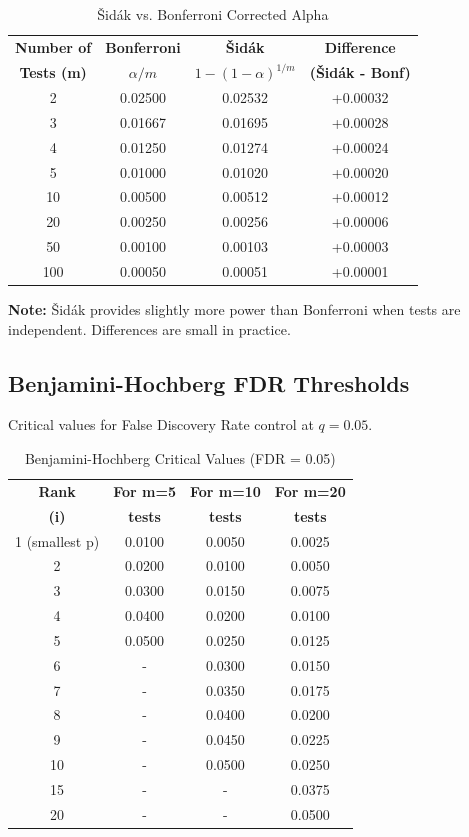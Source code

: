 \begin{table}[h]
\centering
\caption{Šidák vs. Bonferroni Corrected Alpha}
\begin{tabular}{cccc}
\toprule
\textbf{Number of} & \textbf{Bonferroni} & \textbf{Šidák} & \textbf{Difference} \\
\textbf{Tests (m)} & \textbf{$\alpha/m$} & \textbf{$1-(1-\alpha)^{1/m}$} & \textbf{(Šidák - Bonf)} \\
\midrule
2 & 0.02500 & 0.02532 & +0.00032 \\
3 & 0.01667 & 0.01695 & +0.00028 \\
4 & 0.01250 & 0.01274 & +0.00024 \\
5 & 0.01000 & 0.01020 & +0.00020 \\
10 & 0.00500 & 0.00512 & +0.00012 \\
20 & 0.00250 & 0.00256 & +0.00006 \\
50 & 0.00100 & 0.00103 & +0.00003 \\
100 & 0.00050 & 0.00051 & +0.00001 \\
\bottomrule
\end{tabular}
\end{table}

\textbf{Note:} Šidák provides slightly more power than Bonferroni when tests are independent. Differences are small in practice.

\subsection{Benjamini-Hochberg FDR Thresholds}

Critical values for False Discovery Rate control at $q = 0.05$.

\begin{table}[h]
\centering
\caption{Benjamini-Hochberg Critical Values (FDR = 0.05)}
\begin{tabular}{cccc}
\toprule
\textbf{Rank} & \textbf{For m=5} & \textbf{For m=10} & \textbf{For m=20} \\
\textbf{(i)} & \textbf{tests} & \textbf{tests} & \textbf{tests} \\
\midrule
1 (smallest p) & 0.0100 & 0.0050 & 0.0025 \\
2 & 0.0200 & 0.0100 & 0.0050 \\
3 & 0.0300 & 0.0150 & 0.0075 \\
4 & 0.0400 & 0.0200 & 0.0100 \\
5 & 0.0500 & 0.0250 & 0.0125 \\
6 & - & 0.0300 & 0.0150 \\
7 & - & 0.0350 & 0.0175 \\
8 & - & 0.0400 & 0.0200 \\
9 & - & 0.0450 & 0.0225 \\
10 & - & 0.0500 & 0.0250 \\
15 & - & - & 0.0375 \\
20 & - & - & 0.0500 \\
\bottomrule
\end{tabular}
\end{table}

